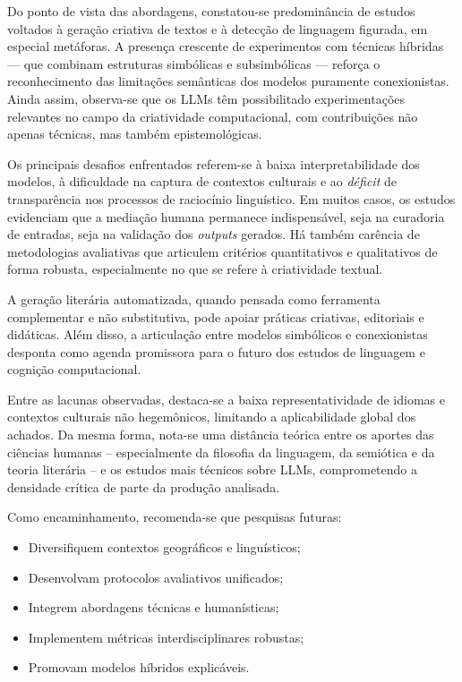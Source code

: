 \documentclass[portuguese]{textolivre}
\begin{document}
Do ponto de vista das abordagens, constatou-se predominância de estudos voltados à geração criativa de textos e à detecção de linguagem figurada, em especial metáforas. A presença crescente de experimentos com técnicas híbridas — que combinam estruturas simbólicas e subsimbólicas — reforça o reconhecimento das limitações semânticas dos modelos puramente conexionistas. Ainda assim, observa-se que os LLMs têm possibilitado experimentações relevantes no campo da criatividade computacional, com contribuições não apenas técnicas, mas também epistemológicas.

Os principais desafios enfrentados referem-se à baixa interpretabilidade dos modelos, à dificuldade na captura de contextos culturais e ao \textit{déficit} de transparência nos processos de raciocínio linguístico. Em muitos casos, os estudos evidenciam que a mediação humana permanece indispensável, seja na curadoria de entradas, seja na validação dos \textit{outputs} gerados. Há também carência de metodologias avaliativas que articulem critérios quantitativos e qualitativos de forma robusta, especialmente no que se refere à criatividade textual.

A geração literária automatizada, quando pensada como ferramenta complementar e não substitutiva, pode apoiar práticas criativas, editoriais e didáticas. Além disso, a articulação entre modelos simbólicos e conexionistas desponta como agenda promissora para o futuro dos estudos de linguagem e cognição computacional.

Entre as lacunas observadas, destaca-se a baixa representatividade de idiomas e contextos culturais não hegemônicos, limitando a aplicabilidade global dos achados. Da mesma forma, nota-se uma distância teórica entre os aportes das ciências humanas -- especialmente da filosofia da linguagem, da semiótica e da teoria literária -- e os estudos mais técnicos sobre LLMs, comprometendo a densidade crítica de parte da produção analisada.

Como encaminhamento, recomenda-se que pesquisas futuras:

\begin{itemize}
    \item Diversifiquem contextos geográficos e linguísticos;
    \item Desenvolvam protocolos avaliativos unificados;
    \item Integrem abordagens técnicas e humanísticas;
    \item Implementem métricas interdisciplinares robustas;
    \item Promovam modelos híbridos explicáveis.
\end{itemize}
\end{document}
